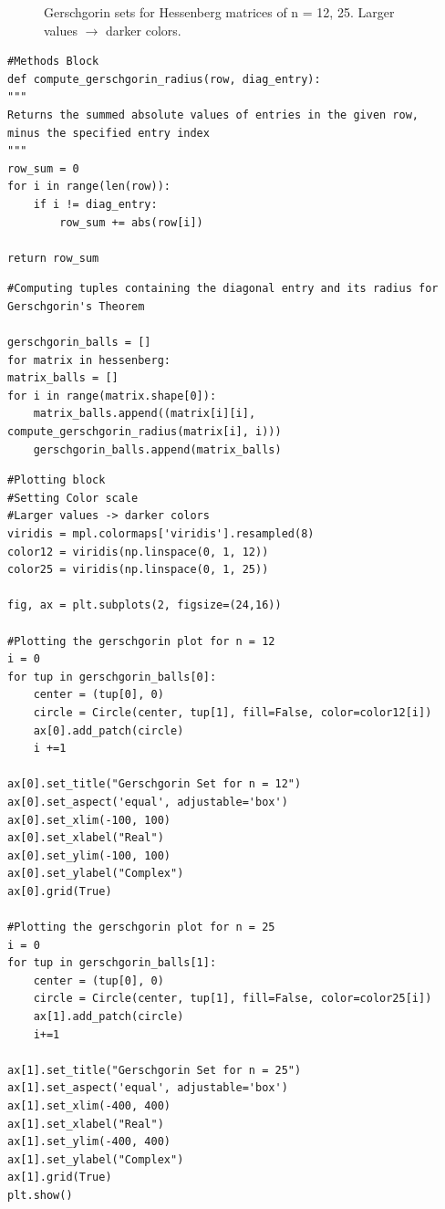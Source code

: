 \begin{solution}
\begin{figure}[!h]
\caption{Gerschgorin sets for Hessenberg matrices of n = 12, 25. Larger values $\rightarrow$ darker colors.}
\label{png:gerschgorin sets}
\end{figure}

\newpage
\begin{lstlisting}
#Methods Block
def compute_gerschgorin_radius(row, diag_entry):
"""
Returns the summed absolute values of entries in the given row, 
minus the specified entry index
"""
row_sum = 0
for i in range(len(row)):
    if i != diag_entry:
        row_sum += abs(row[i])
        
return row_sum
\end{lstlisting}

\begin{lstlisting}
#Computing tuples containing the diagonal entry and its radius for Gerschgorin's Theorem

gerschgorin_balls = []
for matrix in hessenberg:
matrix_balls = []
for i in range(matrix.shape[0]):
    matrix_balls.append((matrix[i][i], compute_gerschgorin_radius(matrix[i], i)))
    gerschgorin_balls.append(matrix_balls)
\end{lstlisting}

\begin{lstlisting}
#Plotting block
#Setting Color scale
#Larger values -> darker colors
viridis = mpl.colormaps['viridis'].resampled(8)
color12 = viridis(np.linspace(0, 1, 12))
color25 = viridis(np.linspace(0, 1, 25))

fig, ax = plt.subplots(2, figsize=(24,16))

#Plotting the gerschgorin plot for n = 12
i = 0
for tup in gerschgorin_balls[0]:
    center = (tup[0], 0)
    circle = Circle(center, tup[1], fill=False, color=color12[i])
    ax[0].add_patch(circle)
    i +=1

ax[0].set_title("Gerschgorin Set for n = 12")
ax[0].set_aspect('equal', adjustable='box')
ax[0].set_xlim(-100, 100)
ax[0].set_xlabel("Real")
ax[0].set_ylim(-100, 100)
ax[0].set_ylabel("Complex")
ax[0].grid(True)  

#Plotting the gerschgorin plot for n = 25
i = 0
for tup in gerschgorin_balls[1]:
    center = (tup[0], 0)
    circle = Circle(center, tup[1], fill=False, color=color25[i])
    ax[1].add_patch(circle)
    i+=1
    
ax[1].set_title("Gerschgorin Set for n = 25")
ax[1].set_aspect('equal', adjustable='box')
ax[1].set_xlim(-400, 400)
ax[1].set_xlabel("Real")
ax[1].set_ylim(-400, 400)
ax[1].set_ylabel("Complex")
ax[1].grid(True)  
plt.show()
\end{lstlisting}
\end{solution}

